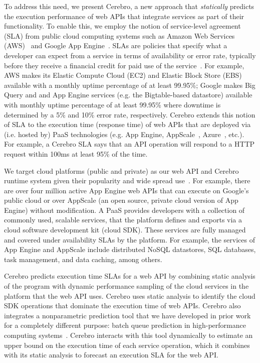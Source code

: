 To address this need, we present Cerebro, a new approach that
\textit{statically} predicts the execution performance of web APIs that 
integrate services as part of their functionality.
To enable this, we employ the notion of service-level agreement (SLA) from 
public cloud computing systems such as Amazon Web Services (AWS)~\cite{amazon-aws-web} and 
Google App Engine~\cite{gae}.  SLAs are policies that specify
what a developer can expect from a service in terms of availability or error rate,
typically before they receive a financial credit for paid
use of the service~\cite{aws-ec2-sla,aws-s3-sla,aws-rds-sla,gae-sla,gcs-sla}.
For example, AWS makes its Elastic Compute Cloud (EC2) and Elastic Block Store (EBS) 
available with a monthly uptime percentage 
of at least 99.95\%; Google makes Big Query and and App Engine services (e.g. the 
Bigtable-based datastore) available with monthly uptime percentage of at least 
99.95\% where downtime is determined by a 5\% and 10\% error rate, respectively.
Cerebro extends this notion of SLA to the execution time (response time) 
of web APIs that are deployed via (i.e. hosted by) PaaS
technologies (e.g. App Engine, 
AppScale~\cite{6488671}, Azure~\cite{azure-web}, etc.).
For example, a Cerebro SLA says that an API operation will respond to a HTTP request
within 100ms at least 95\% of the time.

We target cloud platforms (public and private) as our web API and Cerebro 
runtime system given their popularity and wide spread use~\cite{paas-growth}.
For example, there are over four million active App Engine web APIs that 
can execute on Google's public cloud or over AppScale (an open source, private 
cloud version of App Engine) without modification.  A PaaS provides developers 
with a collection of commonly used, scalable services,
that the platform defines and exports via a cloud software 
development kit (cloud SDK).  These services are fully managed and covered under 
availability SLAs by the platform. For example, the services 
of App Engine and AppScale 
include distributed NoSQL datastores, SQL databases, task management, 
and data caching, among others. 

Cerebro predicts execution time SLAs for a web API by combining static analysis
of the program with dynamic performance sampling of the cloud services 
in the platform that the web API uses.
Cerebro uses static analysis to identify the cloud SDK operations
that dominate the execution time of web APIs.  Cerebro also integrates a nonparametric
prediction tool that we have developed in prior work for a completely different 
purpose: batch queue prediction in high-performance computing 
systems~\cite{Nurmi:2007:QQB:1791551.1791556}. Cerebro interacts with this tool
dynamically to estimate an upper bound on the execution time of each service operation, 
which it combines with its static analysis to forecast an execution SLA for the web API.

